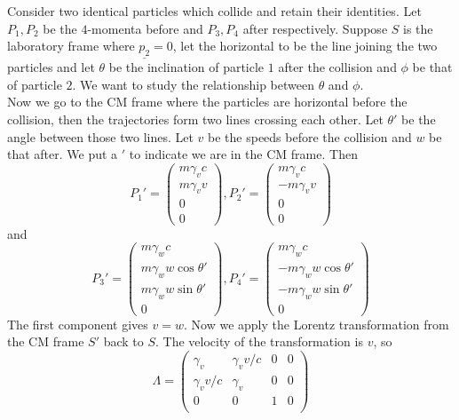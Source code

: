 \begin{example}
    Consider two identical particles which collide and retain their identities.
    Let $P_1,P_2$ be the $4$-momenta before and $P_3,P_4$ after respectively.
    Suppose $S$ is the laboratory frame where $\underline{p_2}=0$, let the horizontal to be the line joining the two particles and let $\theta$ be the inclination of particle $1$ after the collision and $\phi$ be that of particle $2$.
    We want to study the relationship between $\theta$ and $\phi$.\\
    Now we go to the CM frame where the particles are horizontal before the collision, then the trajectories form two lines crossing each other.
    Let $\theta'$ be the angle between those two lines.
    Let $v$ be the speeds before the collision and $w$ be that after.
    We put a $'$ to indicate we are in the CM frame.
    Then
    $$P_1'=\begin{pmatrix}
        m\gamma_vc\\
        m\gamma_vv\\
        0\\
        0
    \end{pmatrix},P_2'=\begin{pmatrix}
        m\gamma_vc\\
        -m\gamma_vv\\
        0\\
        0
    \end{pmatrix}$$
    and
    $$P_3'=\begin{pmatrix}
        m\gamma_wc\\
        m\gamma_ww\cos\theta'\\
        m\gamma_ww\sin\theta'\\
        0
    \end{pmatrix},P_4'=\begin{pmatrix}
        m\gamma_wc\\
        -m\gamma_ww\cos\theta'\\
        -m\gamma_ww\sin\theta'\\
        0
    \end{pmatrix}$$
    The first component gives $v=w$.
    Now we apply the Lorentz transformation from the CM frame $S'$ back to $S$.
    The velocity of the transformation is $v$, so
    $$\Lambda=\begin{pmatrix}
        \gamma_v&\gamma_vv/c&0&0\\
        \gamma_vv/c&\gamma_v&0&0\\
        0&0&1&0\\

\end{pmatrix}$$
\end{example}
